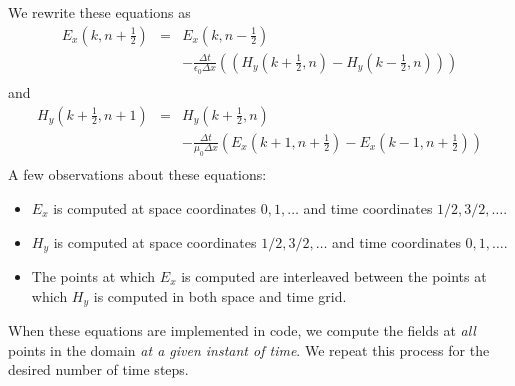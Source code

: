\documentclass[11pt]{article}
\numberwithin{equation}{section}
\begin{document}
We rewrite these equations as
\begin{eqnarray}
E_x\left(k ,n+\frac{1}{2}\right) &=& E_x\left(k ,
n-\frac{1}{2}\right) \nonumber \\
 & & -\frac{\Delta t}{\epsilon_0\Delta x}\left(\left(
H_y\left(k + \frac{1}{2}, n\right) - H_y\left(k - \frac{1}{2}, n\right)\right)
\right) \nonumber \\
 & & \label{s5e9}
\end{eqnarray}
and
\begin{eqnarray}
H_y\left(k+\frac{1}{2},n+1\right) &=& H_y\left(k+\frac{1}{2}, n\right) 
\nonumber \\
 & & -\frac{\Delta t}{\mu_0\Delta x}\left(
E_x\left(k + 1, n + \frac{1}{2}\right) - E_x\left(k - 1, n+\frac{1}{2}\right)
\right) \nonumber \\
 & & \label{s5e10}
\end{eqnarray}
A few observations about these equations:
\begin{itemize}
\item $E_x$ is computed at space coordinates $0, 1, \ldots$ and time 
coordinates $1/2, 3/2, \ldots$.
\item $H_y$ is computed at space coordinates $1/2, 3/2, \ldots$ and time 
coordinates $0, 1, \ldots$.
\item The points at which $E_x$ is computed are interleaved between the points
at which $H_y$ is computed in both space and time grid.
\end{itemize}
When these equations are implemented in code, we compute the fields at 
\emph{all} points in the domain \emph{at a given instant of time}. We repeat
this process for the desired number of time steps. 
\end{document}
